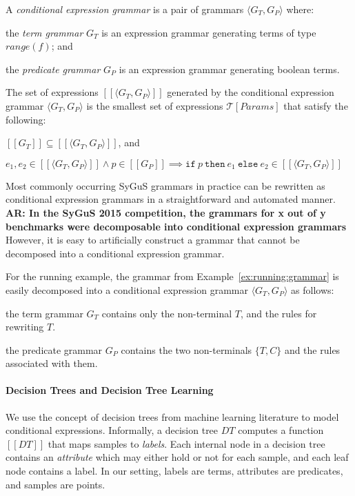 \documentclass{llncs}
\newcommand\arsays[1]{{\bf AR: #1}}
\newcommand\tuple[1]{\langle #1 \rangle}
\newcommand\Expr{e}
\newcommand\Pred{p}
\newcommand\Grammar{G}
\newcommand\sem[1]{[\![ #1 ]\!]}
\newcommand\SynthFun{f}
\newcommand\range{\mathit{range}}
\newcommand\FormalParameters{\mathit{Params}}
\newcommand\Theory{\mathcal{T}}
\newcommand\ITE[3]{\mathtt{if}~#1~\mathtt{then}~#2~\mathtt{else}~#3}
\newcommand\DecisionTree{\mathit{DT}}
\newcommand{\sygus}{{\sffamily\fontsize{8.5}{10}\selectfont
    SyGuS}\xspace}
\begin{document}
A {\em conditional expression grammar} is a pair of grammars $\tuple{
\Grammar_T, \Grammar_P }$ where:
\begin{inparaenum}[(a)]
\item the {\em term grammar} $\Grammar_T$ is an expression grammar
  generating terms of type $\range(\SynthFun)$; and
\item the {\em predicate grammar} $\Grammar_P$ is an expression
  grammar generating boolean terms.
\end{inparaenum}
The set of expressions $\sem{\tuple{ \Grammar_T, \Grammar_P }}$
generated by the conditional expression grammar $\tuple{ G_T, G_P }$ is
the smallest set of expressions $\Theory[\FormalParameters]$ that
satisfy the following:
\begin{inparaenum}[(a)]
\item $\sem{\Grammar_T} \subseteq \sem{\tuple{ \Grammar_T, \Grammar_P
  }}$, and
\item $\Expr_1, \Expr_2 \in \sem{\tuple{ \Grammar_T, \Grammar_P }}
  \wedge \Pred \in \sem{\Grammar_P} \implies
  \ITE{\Pred}{\Expr_1}{\Expr_2} \in \sem{\tuple{ \Grammar_T, \Grammar_P }}$
\end{inparaenum}

Most commonly occurring SyGuS grammars in practice can be rewritten
as conditional expression grammars in a straightforward and automated
manner.
\arsays{In the \sygus 2015 competition, the grammars for x out of y
benchmarks were decomposable into conditional expression grammars}
However, it is easy to artificially construct a grammar that cannot be
decomposed into a conditional expression grammar.

\begin{example}
  For the running example, the grammar from
  Example~\ref{ex:running:grammar} is easily decomposed into a
  conditional expression grammar $\tuple{\Grammar_T, \Grammar_P}$ as
  follows:
  \begin{inparaenum}[(a)]
  \item the term grammar $\Grammar_T$ contains only the non-terminal
    $T$, and the rules for rewriting $T$.
  \item the predicate grammar $\Grammar_P$ contains the two
    non-terminals $\{ T, C \}$ and the rules associated with them.
  \end{inparaenum}
\end{example}

\paragraph{Decision Trees and Decision Tree Learning}
We use the concept of decision trees from machine learning literature to
model conditional expressions.
Informally, a decision tree $\DecisionTree$ computes a function
$\sem{\DecisionTree}$ that maps samples to {\em labels}.
Each internal node in a decision tree contains an {\em attribute} which
may either hold or not for each sample, and each leaf node contains a
label.
In our setting, labels are terms, attributes are predicates, and samples
are points.
\end{document}
